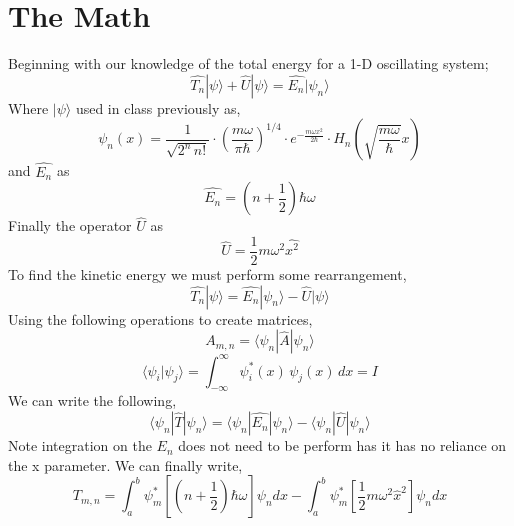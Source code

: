 \documentclass[12pt,letterpaper,notitlepage]{article}
\begin{document}
 
\section{The Math}

Beginning with our knowledge of the total energy for a 1-D oscillating system;
	\begin{equation}
		\hat{T_n}|{\psi}\rangle+\hat{U}|{\psi}\rangle=\hat{E_n}|{\psi_n}\rangle
	\end{equation}
Where $|{\psi}\rangle$ used in class previously as, 
	\begin{equation}
		\psi_n(x) = \frac{1}{\sqrt{2^n\,n!}} \cdot \left(\frac{m\omega}{\pi \hbar}\right)^{1/4}\cdot e^{
		- \frac{m\omega x^2}{2 \hbar}} \cdot H_n\left(\sqrt{\frac{m\omega}{\hbar}} x \right)
	\end{equation}
and $\hat{E_n}$ as 
	\begin{equation}
		\hat{E_n}= \left(n+\frac{1}{2}\right) \hbar \omega	
	\end{equation} 
Finally the operator $\hat{U}$ as 
	\begin{equation}
		\hat{U}= \frac{1}{2}m\omega^2\hat{x^2}
	\end{equation} 
To find the kinetic energy we must perform some rearrangement,
	\begin{equation}
		\hat{T_n}|{\psi}\rangle=\hat{E_n}|{\psi_n}\rangle-\hat{U}|{\psi}\rangle
	\end{equation} 
Using the following operations to create matrices,
	\begin{equation}
		A_{m,n}=\langle{\psi_n}|\hat{A}|{\psi_n}\rangle
	\end{equation} 
	\begin {equation}
		\langle \psi_i | \psi_j \rangle = \int^{\infty}_{-\infty} \psi^{*}_{i}(x)\, \psi_{j}(x) \, dx = I
	\end{equation} 
We can write the following,
	\begin{equation}
		\langle{\psi_n}|\hat{T}|{\psi_n}\rangle=\langle{\psi_n}|\hat{E_n}|{\psi_n}\rangle-\langle{\psi_n}|\hat{U}|{\psi_n}\rangle
	\end{equation} 
Note integration on the $E_n$ does not need to be perform has it has no reliance on the x parameter.
We can finally write, 
	\begin{equation}
		T_{m,n} = \int_{a}^{b} \psi_{m}^{*} [(n+\frac{1}{2})\hbar\omega] \psi_n dx - \int_{a}^{b} \psi_{m}^{*} [\frac{1}{2}m\omega^2\hat{x}^2] \psi_n dx
	\end{equation} 
\end{document}
